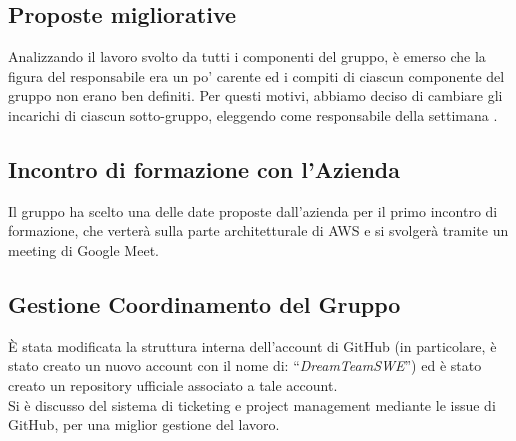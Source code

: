 \subsection{Proposte migliorative}

Analizzando il lavoro svolto da tutti i componenti del gruppo, è emerso che la figura del responsabile era un po' carente ed i compiti di ciascun componente del gruppo non erano ben definiti. Per questi motivi, abbiamo deciso di cambiare gli incarichi di ciascun sotto-gruppo, eleggendo come responsabile della settimana \FP{}. 

\subsection{Incontro di formazione con l'Azienda}

Il gruppo ha scelto una delle date proposte dall'azienda per il primo incontro di formazione, che verterà sulla parte architetturale di AWS e si svolgerà tramite un meeting di Google Meet.

\subsection{Gestione Coordinamento del Gruppo}

È stata modificata la struttura interna dell'account di GitHub (in particolare, è stato creato un nuovo account con il nome di: “\textit{DreamTeamSWE}”) ed è stato creato un repository ufficiale associato a tale account. \\
Si è discusso del sistema di ticketing e project management mediante le issue di GitHub, per una miglior gestione del lavoro.   